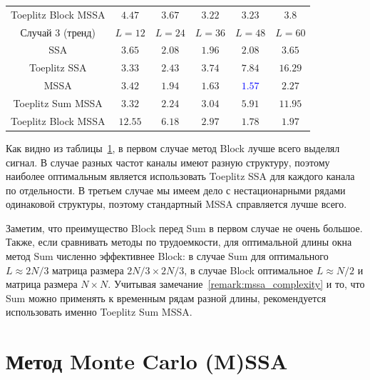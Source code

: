 \documentclass[specialist,
substylefile = spbu_report.rtx,
subf,href,colorlinks=true, 12pt]{disser}
\theoremstyle{definition}
\begin{document}
\begin{table}[h]
\begin{tabular}{cccccc}
			\hline
			Toeplitz Block MSSA              & $4.47$  & $3.67$                     & $\mathbf{3.22}$            & $\mathbf{3.23}$            & $3.8$           \\
			\hhline{======}
			Случай 3 (тренд)                 & $L=12$  & $L=24$                     & $L=36$                     & $L=48$                     & $L=60$          \\
			\hline
			SSA                              & $3.65$  & $2.08$                     & $\mathbf{1.96}$            & $2.08$                     & $3.65$          \\
			\hline
			Toeplitz SSA                     & $3.33$  & $\mathbf{2.43}$            & $3.74$                     & $7.84$                     & $16.29$         \\
			\hline
			MSSA                             & $3.42$  & $1.94$                     & $1.63$                     & \textcolor{blue}{${\mathbf{1.57}}$} & $2.27$          \\
			\hline
			Toeplitz Sum MSSA                & $3.32$  & $\mathbf{2.24}$            & $3.04$                     & $5.91$                     & $11.95$         \\
			\hline
			Toeplitz Block MSSA              & $12.55$ & $6.18$                     & $2.97$                     & $\mathbf{1.78}$            & $1.97$          \\
			\hline
		\end{tabular}
	\label{tab:mse}
\end{table}

Как видно из таблицы~\ref{tab:mse}, в первом случае метод Block лучше всего выделял сигнал. В случае разных частот каналы имеют разную структуру, поэтому наиболее оптимальным является использовать Toeplitz SSA для каждого канала по отдельности.  В третьем случае мы имеем дело с нестационарными рядами одинаковой структуры, поэтому стандартный MSSA справляется лучше всего.

Заметим, что преимущество Block перед Sum в первом случае не очень большое. Также, если сравнивать методы по трудоемкости, для оптимальной длины окна метод Sum численно эффективнее Block: в случае Sum для оптимального $L\approx 2N/3$ матрица размера $2N/3\times2N/3$, в случае Block оптимальное $L\approx N/2$ и матрица размера $N\times N$. Учитывая замечание~\ref{remark:mssa_complexity} и то, что Sum можно применять к временным рядам разной длины, рекомендуется использовать именно Toeplitz Sum MSSA.

\chapter{Метод Monte Carlo (M)SSA}\label{chpt:mc-ssa}
\end{document}
